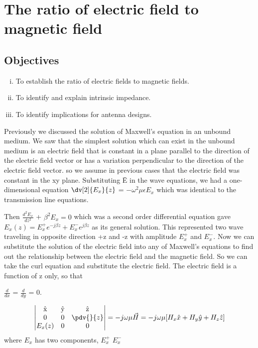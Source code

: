 \chapter{The ratio of electric field to magnetic field}\label{lec:lec22}
\section{Objectives}
\begin{enumerate}[(i)]
\item To establish the ratio of electric fields to magnetic fields.
\item To identify and explain intrinsic impedance.
\item To identify implications for antenna designs.
\end{enumerate}

Previously we discussed the solution of Maxwell's equation in an unbound medium. We saw that the simplest solution which can exist in the unbound medium is an electric field that is constant in a plane parallel to the direction of the electric field vector or has a variation perpendicular to the direction of the electric field vector. so we assume in previous cases that the electric field was constant in the xy plane. Substituting \={E} in the wave equations, we had a one-dimensional equation $\dv[2]{E_x}{z}$ = $-\omega^2\mu\epsilon E_x$ which was identical to the transmission line equations. 

Then $\frac{d^2E_x}{dz^2}$ + $\beta^2 E_x = 0$ which was a second order differential equation gave $E_x({z}) = E_x^{+}e^{-j\beta z} + E_x^{-}e^{j\beta z}$ as its general solution. This represented two wave traveling in opposite direction +z and -z with amplitude $E_x^{+}$ and $E_x^{-}$. Now we can substitute the solution of the electric field into any of Maxwell's equations to find out the relationship between the electric field and the magnetic field. So we can take the curl equation and substitute the electric field. The electric field is a function of z only, so that

$\frac{d}{dx}$ = $\frac{d}{dy}$ = 0.


\begin{dmath*}
\begin{vmatrix}
$\^{x}$ & $\^{y}$ & $\^{z}$\\
0 & 0 & \pdv{}{z}\\
$$E_{x}(z)$$ & 0 & 0
\end{vmatrix} =-j\omega\mu\vec{H} =-j\omega\mu[H_x\hat{x} + H_y\hat{y} + H_z\hat{z}]
\end{dmath*}
where $E_x$ has two components, $E_x^{+}$  $E_x^{-}$


